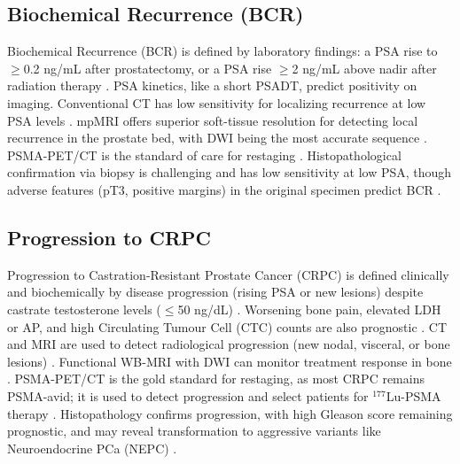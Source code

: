 \documentclass[11pt, a4paper]{article}
\begin{document}
\subsection{Biochemical Recurrence (BCR)}
Biochemical Recurrence (BCR) is defined by laboratory findings: a PSA rise to $\geq$0.2 ng/mL after prostatectomy, or a PSA rise $\geq$2 ng/mL above nadir after radiation therapy \cite{ShiYu2024,MolinBarry2024}. PSA kinetics, like a short PSADT, predict positivity on imaging. Conventional CT has low sensitivity for localizing recurrence at low PSA levels \cite{LuiningMeijer2021,AmalachandranSivathapandi2024}. mpMRI offers superior soft-tissue resolution for detecting local recurrence in the prostate bed, with DWI being the most accurate sequence \cite{AmalachandranSivathapandi2024,ShiYu2024}. PSMA-PET/CT is the standard of care for restaging \cite{AmalachandranSivathapandi2024,RenYuan2015}. Histopathological confirmation via biopsy is challenging and has low sensitivity at low PSA, though adverse features (pT3, positive margins) in the original specimen predict BCR \cite{AteDemirel2024}.

\subsection{Progression to CRPC}
Progression to Castration-Resistant Prostate Cancer (CRPC) is defined clinically and biochemically by disease progression (rising PSA or new lesions) despite castrate testosterone levels ($\leq$50 ng/dL) \cite{CalderoniMaietti2023}. Worsening bone pain, elevated LDH or AP, and high Circulating Tumour Cell (CTC) counts are also prognostic \cite{Ronningas_2022}.  CT and MRI are used to detect radiological progression (new nodal, visceral, or bone lesions) \cite{LeePark2020,AmalachandranSivathapandi2024}. Functional WB-MRI with DWI can monitor treatment response in bone \cite{BrissetHoff2015,DammeTombal2021}. PSMA-PET/CT is the gold standard for restaging, as most CRPC remains PSMA-avid; it is used to detect progression and select patients for ${}^{177}$Lu-PSMA therapy \cite{CalderoniMaietti2023,VetroneMei2023}. Histopathology confirms progression, with high Gleason score remaining prognostic, and may reveal transformation to aggressive variants like Neuroendocrine PCa (NEPC) .
\end{document}
